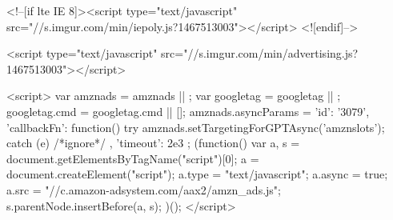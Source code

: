     <!--[if lte IE 8]><script type="text/javascript" src="//s.imgur.com/min/iepoly.js?1467513003"></script>
<![endif]-->
    

                        <script type="text/javascript" src="//s.imgur.com/min/advertising.js?1467513003"></script>

<script>
    var amznads = amznads || { };
    var googletag = googletag || { };
    googletag.cmd = googletag.cmd || [];
    amznads.asyncParams = {
        'id': '3079',
        'callbackFn': function() {
            try {
                amznads.setTargetingForGPTAsync('amznslots');
            } catch (e) { /*ignore*/ }
        },
        'timeout': 2e3
    };
    (function() {
        var a, s = document.getElementsByTagName("script")[0];
        a = document.createElement("script");
        a.type = "text/javascript";
        a.async = true;
        a.src = "//c.amazon-adsystem.com/aax2/amzn_ads.js";
        s.parentNode.insertBefore(a, s);
    })();
</script>

